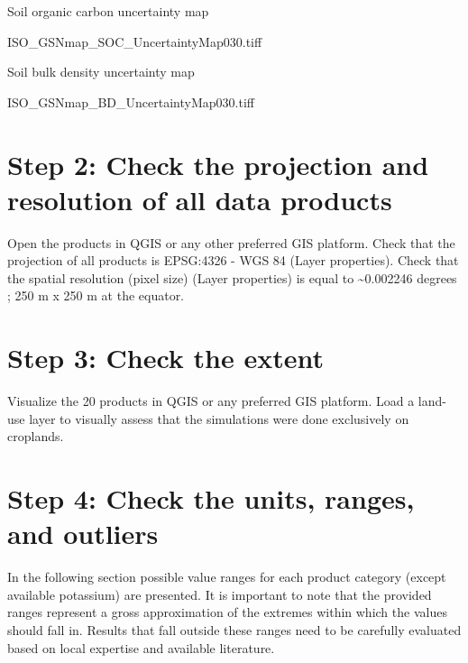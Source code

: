 \documentclass[
  10pt,
  b5paper,
  oneside]{book}
\begin{document}
Soil organic carbon uncertainty map

ISO\_GSNmap\_SOC\_UncertaintyMap030.tiff

Soil bulk density uncertainty map

ISO\_GSNmap\_BD\_UncertaintyMap030.tiff

\hypertarget{step-2-check-the-projection-and-resolution-of-all-data-products}{%
\section*{Step 2: Check the projection and resolution of all data products}\label{step-2-check-the-projection-and-resolution-of-all-data-products}}

Open the products in QGIS or any other preferred GIS platform. Check that the projection of all products is EPSG:4326 - WGS 84 (Layer properties). Check that the spatial resolution (pixel size) (Layer properties) is equal to \textasciitilde0.002246 degrees ; 250 m x 250 m at the equator.

\hypertarget{step-3-check-the-extent}{%
\section*{Step 3: Check the extent}\label{step-3-check-the-extent}}

Visualize the 20 products in QGIS or any preferred GIS platform. Load a land-use layer to visually assess that the simulations were done exclusively on croplands.

\hypertarget{step-4-check-the-units-ranges-and-outliers}{%
\section*{Step 4: Check the units, ranges, and outliers}\label{step-4-check-the-units-ranges-and-outliers}}

In the following section possible value ranges for each product category (except available potassium) are presented. It is important to note that the provided ranges represent a gross approximation of the extremes within which the values should fall in. Results that fall outside these ranges need to be carefully evaluated based on local expertise and available literature.
\end{document}
